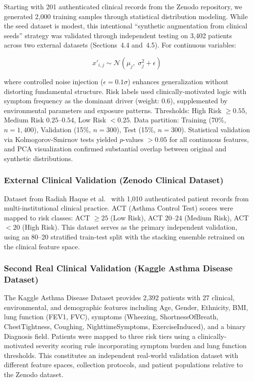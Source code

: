 \documentclass[11pt,a4paper]{article}
\begin{document}
Starting with 201 authenticated clinical records from the Zenodo repository,
we generated 2,000 training samples through statistical distribution modeling.
While the seed dataset is modest, this intentional ``synthetic augmentation from
clinical seeds'' strategy was validated through independent testing on 3,402
patients across two external datasets (Sections~4.4 and~4.5). For continuous variables:

\begin{equation}
  x'_{i,j} \sim \mathcal{N}\!\left(\mu_j,\; \sigma_j^2 + \epsilon\right)
  \label{eq:synthetic}
\end{equation}

where controlled noise injection ($\epsilon = 0.1\sigma$) enhances generalization
without distorting fundamental structure. Risk labels used clinically-motivated logic
with symptom frequency as the dominant driver (weight: 0.6), supplemented by
environmental parameters and exposure patterns. Thresholds: High Risk $\geq 0.55$,
Medium Risk $0.25$--$0.54$, Low Risk $< 0.25$.
Data partition: Training (70\%, $n=1{,}400$), Validation (15\%, $n=300$), Test (15\%, $n=300$).
Statistical validation via Kolmogorov-Smirnov tests yielded $p$-values $> 0.05$
for all continuous features, and PCA visualization confirmed substantial overlap between
original and synthetic distributions.

\subsubsection{External Clinical Validation (Zenodo Clinical Dataset)}

Dataset from Radiah Haque et al.\ \cite{haque2024} with 1,010 authenticated patient
records from multi-institutional clinical practice. ACT (Asthma Control Test) scores were
mapped to risk classes: ACT $\geq 25$ (Low Risk), ACT $20$--$24$ (Medium Risk),
ACT $< 20$ (High Risk). This dataset serves as the primary independent validation, using
an 80--20 stratified train-test split with the stacking ensemble retrained on the
clinical feature space.

\subsubsection{Second Real Clinical Validation (Kaggle Asthma Disease Dataset)}

The Kaggle Asthma Disease Dataset \cite{kaggleasthma2024} provides 2,392 patients
with 27 clinical, environmental, and demographic features including Age, Gender,
Ethnicity, BMI, lung function (FEV1, FVC), symptoms (Wheezing, ShortnessOfBreath,
ChestTightness, Coughing, NighttimeSymptoms, ExerciseInduced), and a binary Diagnosis
field. Patients were mapped to three risk tiers using a clinically-motivated severity
scoring rule incorporating symptom burden and lung function thresholds. This constitutes
an independent real-world validation dataset with different feature spaces, collection
protocols, and patient populations relative to the Zenodo dataset.
\end{document}
